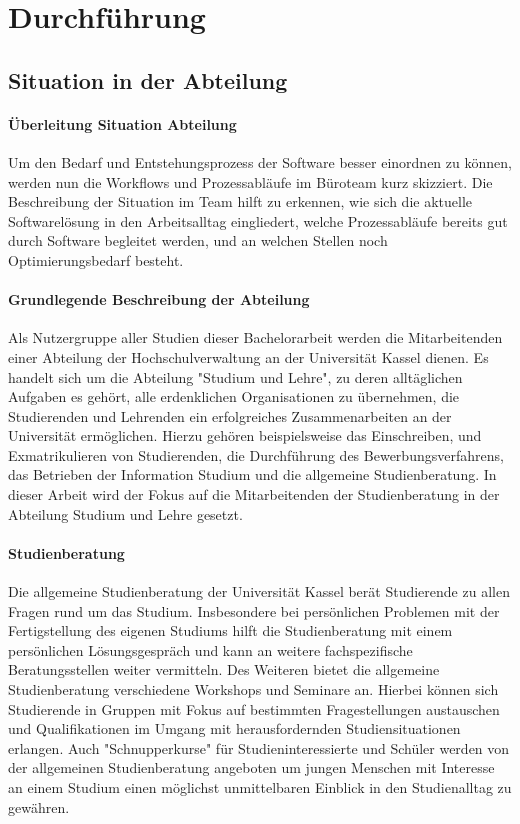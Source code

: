 \section{Durchführung}
\label{chapterPractice}

\subsection{Situation in der Abteilung}

\paragraph{Überleitung Situation Abteilung}
Um den Bedarf und Entstehungsprozess der Software besser einordnen zu können,
werden nun die Workflows und Prozessabläufe im Büroteam kurz skizziert. Die
Beschreibung der Situation im Team hilft zu erkennen, wie sich die aktuelle
Softwarelösung in den Arbeitsalltag eingliedert, welche Prozessabläufe bereits
gut durch Software begleitet werden, und an welchen Stellen noch
Optimierungsbedarf besteht.

\paragraph{Grundlegende Beschreibung der Abteilung}
Als Nutzergruppe aller Studien dieser Bachelorarbeit werden die Mitarbeitenden
einer Abteilung der Hochschulverwaltung an der Universität Kassel dienen. Es
handelt sich um die Abteilung "Studium und Lehre", zu deren alltäglichen
Aufgaben es gehört, alle erdenklichen Organisationen zu übernehmen, die
Studierenden und Lehrenden ein erfolgreiches Zusammenarbeiten an der
Universität ermöglichen. Hierzu gehören beispielsweise das Einschreiben, und
Exmatrikulieren von Studierenden, die Durchführung des Bewerbungsverfahrens,
das Betrieben der Information Studium und die allgemeine Studienberatung. In
dieser Arbeit wird der Fokus auf die Mitarbeitenden der Studienberatung in der
Abteilung Studium und Lehre gesetzt.

\paragraph{Studienberatung}
Die allgemeine Studienberatung der Universität Kassel berät Studierende zu
allen Fragen rund um das Studium. Insbesondere bei persönlichen Problemen mit
der Fertigstellung des eigenen Studiums hilft die Studienberatung mit einem
persönlichen Lösungsgespräch und kann an weitere fachspezifische
Beratungsstellen weiter vermitteln. Des Weiteren bietet die allgemeine
Studienberatung verschiedene Workshops und Seminare an. Hierbei können sich
Studierende in Gruppen mit Fokus auf bestimmten Fragestellungen austauschen und
Qualifikationen im Umgang mit herausfordernden Studiensituationen erlangen.
Auch "Schnupperkurse" für Studieninteressierte und Schüler werden von der
allgemeinen Studienberatung angeboten um jungen Menschen mit Interesse an einem
Studium einen möglichst unmittelbaren Einblick in den Studienalltag zu
gewähren.\cite{studBeratungKsWeb}

